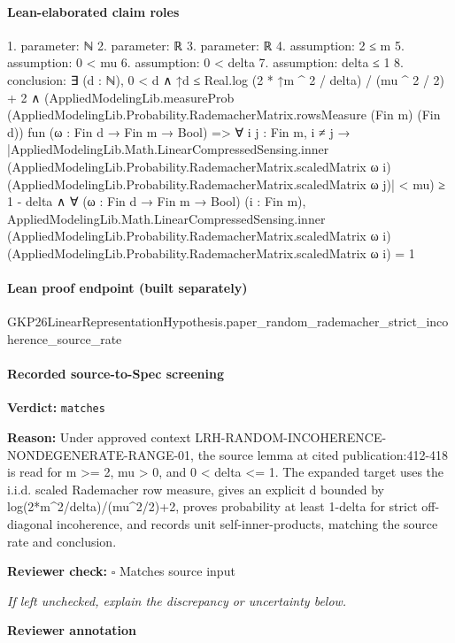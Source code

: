 \documentclass[10pt]{article}
\newcommand{\reviewerbox}{%
  \par\noindent\fbox{\parbox{0.96\linewidth}{\rule{0pt}{0.38in}}}\par
}
\newcommand{\reviewmatch}[1]{%
  \par\noindent\textbf{Reviewer check:} $\square$\; #1\par
  \noindent\emph{If left unchecked, explain the discrepancy or uncertainty below.}\par
}
\begin{document}
\paragraph{Lean-elaborated claim roles}\begin{ReviewVerbatim}
1. parameter: ℕ
2. parameter: ℝ
3. parameter: ℝ
4. assumption: 2 ≤ m
5. assumption: 0 < mu
6. assumption: 0 < delta
7. assumption: delta ≤ 1
8. conclusion: ∃ (d : ℕ),
  0 < d ∧
    ↑d ≤ Real.log (2 * ↑m ^ 2 / delta) / (mu ^ 2 / 2) + 2 ∧
      (AppliedModelingLib.measureProb (AppliedModelingLib.Probability.RademacherMatrix.rowsMeasure (Fin m) (Fin d))
            fun (ω : Fin d → Fin m → Bool) =>
            ∀ {{i j : Fin m}},
              i ≠ j →
                |AppliedModelingLib.Math.LinearCompressedSensing.inner
                      (AppliedModelingLib.Probability.RademacherMatrix.scaledMatrix ω i)
                      (AppliedModelingLib.Probability.RademacherMatrix.scaledMatrix ω j)| <
                  mu) ≥
          1 - delta ∧
        ∀ (ω : Fin d → Fin m → Bool) (i : Fin m),
          AppliedModelingLib.Math.LinearCompressedSensing.inner
              (AppliedModelingLib.Probability.RademacherMatrix.scaledMatrix ω i)
              (AppliedModelingLib.Probability.RademacherMatrix.scaledMatrix ω i) =
            1
\end{ReviewVerbatim}

\paragraph{Lean proof endpoint (built separately)}\begin{ReviewVerbatim}
GKP26LinearRepresentationHypothesis.paper_random_rademacher_strict_incoherence_source_rate
\end{ReviewVerbatim}

\paragraph{Recorded source-to-Spec screening}
\textbf{Verdict:} \texttt{matches}
\\
{\raggedright
\textbf{Reason:} Under approved context LRH-\allowbreak{}RANDOM-\allowbreak{}INCOHERENCE-\allowbreak{}NONDEGENERATE-\allowbreak{}RANGE-\allowbreak{}01, the source lemma at cited publication:\allowbreak{}412-\allowbreak{}418 is read for m >= 2, mu > 0, and 0 < delta <= 1.\allowbreak{} The expanded target uses the i.\allowbreak{}i.\allowbreak{}d.\allowbreak{} scaled Rademacher row measure, gives an explicit d bounded by log(2*m\textasciicircum{}2/\allowbreak{}delta)/\allowbreak{}(mu\textasciicircum{}2/\allowbreak{}2)+2, proves probability at least 1-\allowbreak{}delta for strict off-\allowbreak{}diagonal incoherence, and records unit self-\allowbreak{}inner-\allowbreak{}products, matching the source rate and conclusion.\allowbreak{}
\par}
\reviewmatch{Matches source input}
\noindent\textbf{Reviewer annotation}\par
\reviewerbox
\clearpage
\hypertarget{source-claim-c333ecf427637954}{}
\end{document}
